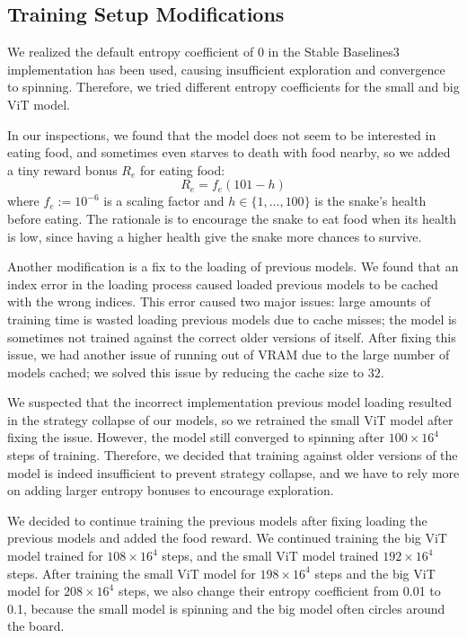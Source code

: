 \documentclass[conference]{IEEEtran}
\begin{document}
\subsection{Training Setup Modifications}

We realized the default entropy coefficient of 0 in the Stable Baselines3
implementation has been used,
causing insufficient exploration and convergence to spinning. Therefore,
we tried different entropy coefficients for the small and big ViT model.

In our inspections,
we found that the model does not seem to be interested in eating food,
and sometimes even starves to death with food nearby,
so we added a tiny reward bonus $R_e$ for eating food:
$$
    R_e = f_e(101 - h)
$$
where $f_e:=10^{-6}$ is a scaling factor and $h\in\{1,\ldots,100\}$ is the
snake's health before eating.
The rationale is to encourage the snake to eat food when its health is low,
since having a higher health give the snake more chances to survive.

Another modification is a fix to the loading of previous models.
We found that an index error in the loading process caused loaded previous
models to be cached with the wrong indices. This error caused two major issues:
large amounts of training time is wasted loading previous models due to cache
misses;
the model is sometimes not trained against the correct older versions of itself.
After fixing this issue,
we had another issue of running out of VRAM due to the large number of models
cached; we solved this issue by reducing the cache size to $32$.

We suspected that the incorrect implementation previous model loading resulted
in the strategy collapse of our models,
so we retrained the small ViT model after fixing the issue. However,
the model still converged to spinning after $100\times 16^4$ steps of training.
Therefore,
we decided that training against older versions of the model is indeed
insufficient to prevent strategy collapse,
and we have to rely more on adding larger entropy bonuses to encourage
exploration.

We decided to continue training the previous models after fixing loading the
previous models and added the food reward.
We continued training the big ViT model trained for $108\times 16^4$ steps,
and the small ViT model trained $192\times 16^4$ steps.
After training the small ViT model for $198\times 16^4$ steps and the big ViT
model for $208\times 16^4$ steps,
we also change their entropy coefficient from 0.01 to 0.1,
because the small model is spinning and the big model often circles around the
board.
\end{document}
